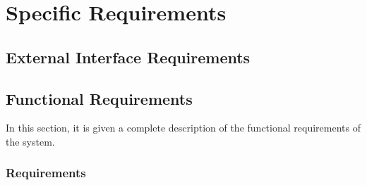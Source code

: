 \chapter{Specific Requirements}

\section{External Interface Requirements}

\section{Functional Requirements}
In this section, it is given a complete description of the functional requirements of the system.

    \subsection{Requirements}
